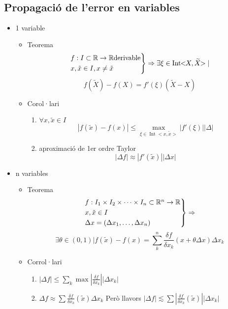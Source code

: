 \documentclass{article}
\newcommand{\R}{\mathbb{R}}
\DeclareMathOperator{\Int}{Int}
\begin{document}
\subsection{Propagació de l'error en variables}
\begin{itemize}
\item 1 variable
	\begin{itemize}
	\item Teorema
		$$
		\begin{rcases}
			f:I \subset \R \to \R \text{derivable}\\
			x, \tilde{x} \in I, x \neq \tilde{x}
		\end{rcases}
		\Rightarrow \exists \xi \in \Int\!\!<\!\!X, \widetilde{X}\!\!>
		|$$$$
		f(\widetilde{X}) - f(X) = f'(\xi) (\widetilde{X} - X)
 		$$
	\item Corol·lari
		\begin{enumerate}
		\item $\forall x, \widetilde{x} \in I$
			$$|f(\tilde{x}) - f(x)| \le \max_{\xi \in \Int\!\!<\!\!x,\tilde{x}\!\!>}|f'(\xi)||\Delta|$$
		\item aproximació de 1er ordre Taylor
			$$|\Delta f| \approx |f'(\tilde{x})||\Delta x|$$
		\end{enumerate}
	\end{itemize}
\item n variables
	\begin{itemize}
	\item Teorema
		$$
		\begin{rcases}
			f:I_1 \times I_2 \times \dots \times I_n \subset \R^n \to \R\\
			x, \tilde{x} \in I\\
			\Delta x = (\Delta x_1, \dots, \Delta x_n)
		\end{rcases} \Rightarrow
		$$
		$$
		\exists \theta \in (0, 1) | f(\tilde{x}) - f(x) =
		\sum^n_k \frac{\delta f}{\delta x_k} (x + \theta \Delta x)\Delta x_k
		$$
	\item Corrol·lari
		\begin{enumerate}
		\item $|\Delta f| \le \sum_k \max |\frac{\delta f}{\delta x_k}||\Delta x_k|$
		\item $\Delta f \approx \sum \frac{\delta f}{\delta x_k}(\tilde{x})\Delta x_k$
			\subitem Però llavors
			\subitem $|\Delta f| \lesssim \sum \left|\frac{\delta f}{\delta x_k}(\tilde{x})\right||\Delta x_k|$
		\end{enumerate}
	\end{itemize}
\end{itemize}
\end{document}
